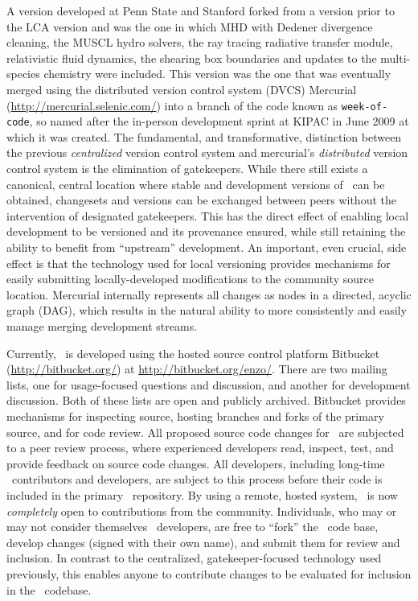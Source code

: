 A version developed at Penn State and Stanford forked from a version
prior to the LCA version and was the one in which MHD with Dedener
divergence cleaning, the MUSCL hydro solvers, the ray tracing
radiative transfer module, relativistic fluid dynamics, the shearing
box boundaries and updates to the multi-species chemistry were
included. This version was the one that was eventually merged using
the distributed version control system (DVCS) Mercurial
(\url{http://mercurial.selenic.com/}) into a branch of the code known
as \texttt{week-of-code}, so named after the in-person development
sprint at KIPAC in June 2009 at which it was created.  The
fundamental, and transformative, distinction between the previous
\textit{centralized} version control system and mercurial's
\textit{distributed} version control system is the elimination of
gatekeepers.  While there still exists a canonical, central location
where stable and development versions of \enzo\ can be obtained,
changesets and versions can be exchanged between peers without the
intervention of designated gatekeepers.  This has the direct effect of
enabling local development to be versioned and its provenance ensured,
while still retaining the ability to benefit from ``upstream''
development.  An important, even crucial, side effect is that the
technology used for local versioning provides mechanisms for easily
submitting locally-developed modifications to the community source
location.  Mercurial internally represents all changes as nodes in a
directed, acyclic graph (DAG), which results in the natural ability to
more consistently and easily manage merging development streams.

Currently, \enzo\ is developed using the hosted source control
platform Bitbucket (\url{http://bitbucket.org/}) at
\url{http://bitbucket.org/enzo/}.  There are two mailing lists, one
for usage-focused questions and discussion, and another for
development discussion.  Both of these lists are open and publicly
archived.  Bitbucket provides mechanisms for inspecting source,
hosting branches and forks of the primary source, and for code review.
All proposed source code changes for \enzo\ are subjected to a peer
review process, where experienced developers read, inspect, test, and
provide feedback on source code changes.  All developers, including
long-time \enzo\ contributors and developers, are subject to this
process before their code is included in the primary \enzo\
repository.  By using a remote, hosted system, \enzo\ is now
\textit{completely} open to contributions from the community.
Individuals, who may or may not consider themselves \enzo\ developers,
are free to ``fork'' the \enzo\ code base, develop changes (signed
with their own name), and submit them for review and inclusion.  In
contrast to the centralized, gatekeeper-focused technology used
previously, this enables anyone to contribute changes to be evaluated
for inclusion in the \enzo\ codebase.

